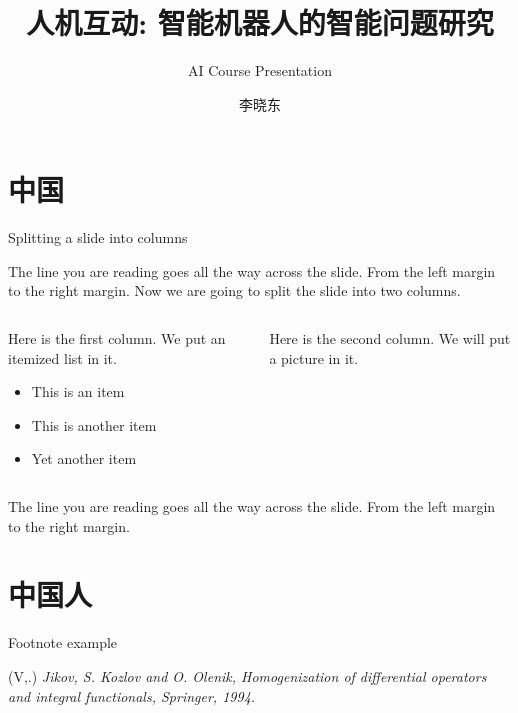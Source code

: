 \documentclass[hyperref={unicode}]{beamer}
\newenvironment{reference}[2]{%
  \begin{textblock*}{\textwidth}(#1,#2) 
      \footnotesize\it\bgroup\color{red!50!black}}{\egroup\end{textblock*}}
\begin{document}
\begin{CJK}{UTF8}{gkai}
\title{人机互动: 智能机器人的智能问题研究}
\subtitle{AI Course Presentation}
\author{李晓东}
\renewcommand{\today}{ April 6, 2012}

\begin{frame}
  \titlepage
\end{frame}

\section{中国}
\begin{frame}{Splitting a slide into columns}

The line you are reading goes all the way across the slide.
From the left margin to the right margin.  Now we are going
to split the slide into two columns.
\bigskip

\begin{columns}
  \begin{column}{0.5\textwidth}
    Here is the first column.  We put an itemized list in it.
    \begin{itemize}
      \item This is an item
      \item This is another item
      \item Yet another item
    \end{itemize}
  \end{column}

  \begin{column}{0.3\textwidth}
    Here is the second column.  We will put a picture in it.
  \end{column}
\end{columns}
\bigskip
The line you are reading goes all the way across the slide.
From the left margin to the right margin.
\end{frame}

\section{中国人}
\begin{frame}{Footnote example}
   \begin{reference}{4mm}{85mm}
       V. Jikov, S. Kozlov and O. Olenik, Homogenization
       of differential operators and integral
       functionals, Springer, 1994.
   \end{reference} 
  

\end{frame}
\end{CJK}
\end{document}
